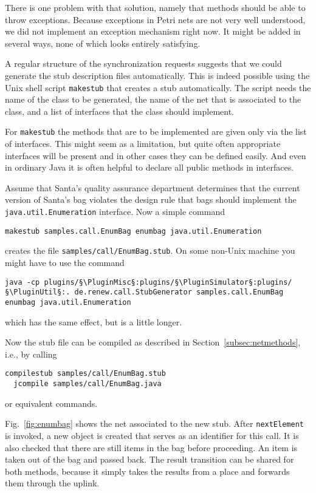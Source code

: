 There is one problem with that solution, namely that methods
should be able to throw exceptions. Because exceptions in Petri nets
are not very well understood, we did not implement an exception
mechanism right now. It might be added in several ways,
none of which looks entirely satisfying.

A regular structure of the synchronization requests suggests
that we could generate the stub description files automatically.
This is indeed possible using the Unix shell script \texttt{makestub}
that creates a stub automatically. The
script needs the name of the class to be generated, the name of
the net that is associated to the class, and a list of interfaces that
the class should implement.

For \texttt{makestub} the methods that are to be implemented
are given only via the list of interfaces. This might seem
as a limitation, but quite often appropriate interfaces will be present
and in other cases they can be defined easily. And even in ordinary Java
it is often helpful to declare all public methods in interfaces.

Assume that Santa's quality assurance department determines that
the current version of Santa's bag violates the design rule
that bags should implement the \texttt{java.util.Enumeration}
interface. Now a simple command
\begin{lstlisting}[style=xnonfloating]
  makestub samples.call.EnumBag enumbag java.util.Enumeration
\end{lstlisting}
creates the file \texttt{samples/call/EnumBag.stub}.
On some non-Unix machine you might have to use the
command
\begin{lstlisting}[style=xnonfloating]
  java -cp plugins/§\PluginMisc§:plugins/§\PluginSimulator§:plugins/§\PluginUtil§:. de.renew.call.StubGenerator samples.call.EnumBag enumbag java.util.Enumeration
\end{lstlisting}
which has the same effect, but is a little longer.

Now the stub file can be compiled as described in
Section~\ref{subsec:netmethods}, i.e., by calling
\begin{lstlisting}[style=xnonfloating]
  compilestub samples/call/EnumBag.stub
  jcompile samples/call/EnumBag.java
\end{lstlisting}
or equivalent commands.


Fig.~\ref{fig:enumbag} shows the net associated to the new stub.
After \texttt{nextElement} is invoked, a new object is created
that serves as an identifier for this call. It is also checked
that there are still items in the bag before proceeding. An item
is taken out of the bag and passed back. The result transition
can be shared for both methods, because it simply takes the results
from a place and forwards them through the uplink.

